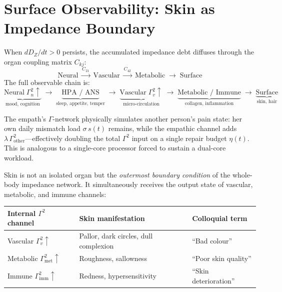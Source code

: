 \documentclass[aps,pre,twocolumn,superscriptaddress,floatfix]{revtex4-2}
\begin{document}
\section{Surface Observability: Skin as Impedance
  Boundary}
\label{sec:surface-readout}

When $dD_Z/dt > 0$ persists, the accumulated
impedance debt diffuses through the organ coupling
matrix $C_{kj}$:
\[
  \text{Neural}
  \;\xrightarrow{C_{21}}\;
  \text{Vascular}
  \;\xrightarrow{C_{42}}\;
  \text{Metabolic}
  \;\to\;
  \text{Surface}
\]
The full observable chain is:
\[
  \underbrace{\text{Neural}\;\Gamma_n^2\!\uparrow}
    _{\text{mood, cognition}}
  \;\to\;
  \underbrace{\text{HPA / ANS}}
    _{\text{sleep, appetite, temper}}
  \;\to\;
  \underbrace{\text{Vascular}\;\Gamma_v^2\!\uparrow}
    _{\text{micro-circulation}}
  \;\to\;
  \underbrace{\text{Metabolic / Immune}}
    _{\text{collagen, inflammation}}
  \;\to\;
  \underbrace{\text{Surface}}
    _{\text{skin, hair}}
\]

\begin{remark}
\label{rem:single-core}
The empath's $\Gamma$-network physically simulates
another person's pain state:
her own daily mismatch load $\sigma\,s(t)$ remains,
while the empathic channel adds
$\lambda\,\Gamma^2_{\text{other}}$---effectively
doubling the total $\Gamma^2$ input on a single
repair budget $\eta(t)$.
This is analogous to a single-core processor
forced to sustain a dual-core workload.
\end{remark}

Skin is not an isolated organ but the
\emph{outermost boundary condition} of the
whole-body impedance network.
It simultaneously receives the output state of
vascular, metabolic, and immune channels:

\begin{center}
\begin{tabular}{lll}
\toprule
Internal $\Gamma^2$ channel &
  Skin manifestation &
  Colloquial term \\
\midrule
Vascular $\Gamma_v^2\!\uparrow$ &
  Pallor, dark circles, dull complexion &
  ``Bad colour'' \\
Metabolic $\Gamma_{\text{met}}^2\!\uparrow$ &
  Roughness, sallowness &
  ``Poor skin quality'' \\
Immune $\Gamma_{\text{imm}}^2\!\uparrow$ &
  Redness, hypersensitivity &
  ``Skin deterioration'' \\
\bottomrule
\end{tabular}
\end{center}
\end{document}
